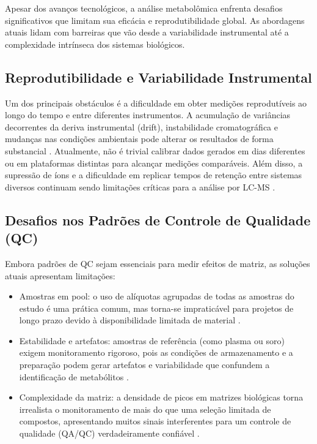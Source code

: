 Apesar dos avanços tecnológicos, a análise metabolômica enfrenta desafios significativos que limitam sua eficácia e reprodutibilidade global. As abordagens atuais lidam com barreiras que vão desde a variabilidade instrumental até a complexidade intrínseca dos sistemas biológicos.

\subsection{Reprodutibilidade e Variabilidade Instrumental}

Um dos principais obstáculos é a dificuldade em obter medições reprodutíveis ao longo do tempo e entre diferentes instrumentos. A acumulação de variâncias decorrentes da deriva instrumental (drift), instabilidade cromatográfica e mudanças nas condições ambientais pode alterar os resultados de forma substancial \cite{jong2018challenges}. Atualmente, não é trivial calibrar dados gerados em dias diferentes ou em plataformas distintas para alcançar medições comparáveis. Além disso, a supressão de íons e a dificuldade em replicar tempos de retenção entre sistemas diversos continuam sendo limitações críticas para a análise por LC-MS \cite{johnson2012challenges}.

\subsection{Desafios nos Padrões de Controle de Qualidade (QC)}

Embora padrões de QC sejam essenciais para medir efeitos de matriz, as soluções atuais apresentam limitações: 
\begin{itemize}
\item Amostras em pool: o uso de alíquotas agrupadas de todas as amostras do estudo é uma prática comum, mas torna-se impraticável para projetos de longo prazo devido à disponibilidade limitada de material \cite{jong2018challenges}.
\item Estabilidade e artefatos: amostras de referência (como plasma ou soro) exigem monitoramento rigoroso, pois as condições de armazenamento e a preparação podem gerar artefatos e variabilidade que confundem a identificação de metabólitos \cite{jong2018challenges, johnson2012challenges}.
\item Complexidade da matriz: a densidade de picos em matrizes biológicas torna irrealista o monitoramento de mais do que uma seleção limitada de compostos, apresentando muitos sinais interferentes para um controle de qualidade (QA/QC) verdadeiramente confiável \cite{jong2018challenges}.
\end{itemize}
